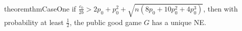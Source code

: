 \begin{restatable}{theorem}{thmCaseOne}
\label{thm:case:1}
\label{thm:eg:independent-w}
    if $\frac{c_0}{2b} > 2p_0 + p_0^2 + \sqrt{n(8p_0 + 10p_0^2 + 4 p_0^3)}$, then with probability at least $\frac{1}{2}$, the public good game $G$ has a unique NE.
\end{restatable}